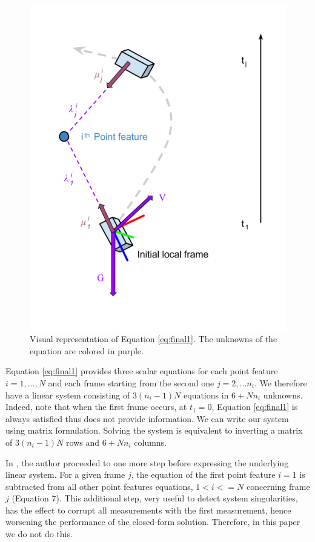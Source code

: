 \documentclass[letterpaper, 10 pt, conference]{ieeeconf}  %
\begin{document}
\begin{figure}
  \centering
  \includegraphics[width=\columnwidth]{images/closedFormExplained}
  \caption{Visual representation of Equation \ref{eq:final1}.
  The unknowns of the equation are colored in \textcolor{amethyst}{purple}.}
\end{figure}

Equation \ref{eq:final1} provides three scalar equations for each point feature $i=1,...,N$ and each frame starting from the second one $j=2,...n_i$.
We therefore have a linear system consisting of $3(n_i-1)N$ equations in $6 + Nn_i$ unknowns.
Indeed, note that when the first frame occurs, at $t_1 = 0$,
Equation \ref{eq:final1} is always satisfied thus does not provide information.
We can write our system using matrix formulation.
Solving the system is equivalent to inverting a matrix of $3(n_i-1)N$ rows and $6+Nn_i$ columns.

In \cite{Martinelli2014}, the author proceeded to one more step before expressing the underlying linear system.
For a given frame $j$, the equation of the first point feature $i=1$ is subtracted from all other point features equations, $1<i<=N$ concerning frame $j$ (Equation 7).
This additional step, very useful to detect system singularities, has the effect to corrupt all measurements with the first measurement,
hence worsening the performance of the closed-form solution. Therefore,
in this paper we do not do this.
\end{document}
